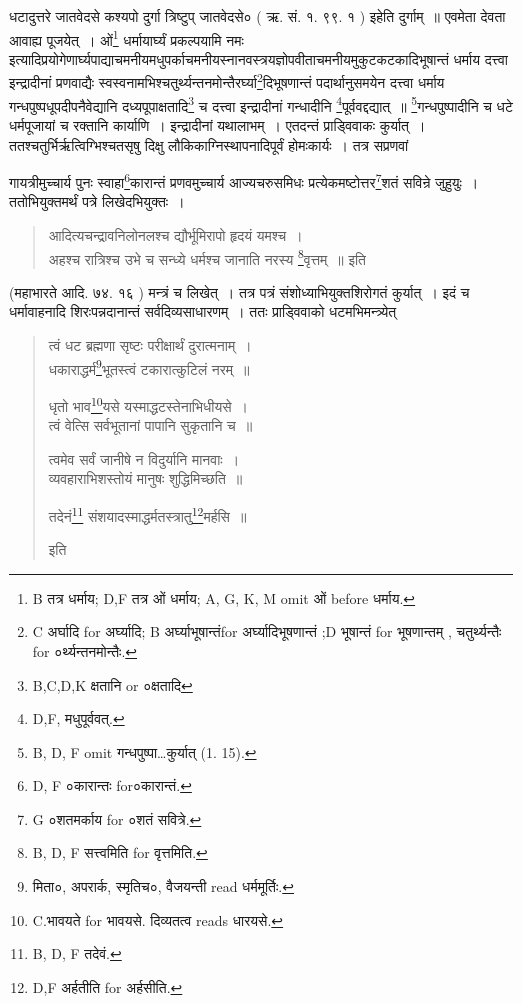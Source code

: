 \documentclass[11pt, openany]{book}
\begin{document}
\begin{sloppypar}
\noindent
धटादुत्तरे जातवेदसे कश्यपो दुर्गा त्रिष्टुप् जातवेदसे० ( ऋ. सं. १. ९९. १ ) इहेति दुर्गाम्~॥ एवमेता देवता आवाह्य पूजयेत्~। ओं\renewcommand{\thefootnote}{5}\footnote{B तत्र धर्माय; D,F तत्र ओं धर्माय; A, G, K, M omit ओं before धर्माय.} धर्मायार्घ्यं प्रकल्पयामि नमः इत्यादिप्रयोगेणार्घ्यपाद्याचमनीयमधुपर्काचमनीयस्नानवस्त्रयज्ञोपवीताचमनीयमुकुटकटकादिभूषान्तं धर्माय दत्त्वा इन्द्रादीनां प्रणवाद्यैः स्वस्वनामभिश्चतुर्थ्यन्तनमोन्तैरर्घ्या\renewcommand{\thefootnote}{6}\footnote{C अर्घादि for अर्घ्यादि; B अर्घ्याभूषान्तंfor अर्घ्यादिभूषणान्तं ;D भूषान्तं for भूषणान्तम् , चतुर्थ्यन्तैः for ०र्थ्यन्तनमोन्तैः.}दिभूषणान्तं पदार्थानुसमयेन दत्त्वा धर्माय गन्धपुष्पधूपदीपनैवेद्यानि दध्यपूपाक्षतादि\renewcommand{\thefootnote}{7}\footnote{B,C,D,K क्षतानि or ०क्षतादि} च दत्त्वा इन्द्रादीनां गन्धादीनि \renewcommand{\thefootnote}{8}\footnote{D,F, मधुपूर्ववत्.}पूर्ववद्दद्यात्~॥ \renewcommand{\thefootnote}{9}\footnote{B, D, F omit गन्धपुष्पा\ldots कुर्यात् (1. 15).}गन्धपुष्पादीनि च धटे धर्मपूजायां च रक्तानि कार्याणि~। इन्द्रादीनां यथालाभम्~। एतदन्तं प्राड्विवाकः कुर्यात्~। ततश्चतुर्भिर्ऋत्विग्भिश्चतसृषु दिक्षु लौकिकाग्निस्थापनादिपूर्वं होमःकार्यः~। तत्र सप्रणवां 
\end{sloppypar}

\newpage

\noindent
गायत्रीमुच्चार्य पुनः स्वाहा\renewcommand{\thefootnote}{1}\footnote{D, F ०कारान्तः for०कारान्तं.}कारान्तं प्रणवमुच्चार्य आज्यचरुसमिधः प्रत्येकमष्टोत्तर\renewcommand{\thefootnote}{2}\footnote{G ०शतमर्काय for ०शतं सवित्रे.}शतं सविन्रे जुहुयुः~। ततोभियुक्तमर्थं पत्रे लिखेदभियुक्तः~।

\begin{quote}
{\vy आदित्यचन्द्रावनिलोनलश्च द्यौर्भूमिरापो हृदयं यमश्च~।\\
अहश्च रात्रिश्च उभे च सन्ध्ये धर्मश्च जानाति नरस्य \renewcommand{\thefootnote}{3}\footnote{B, D, F सत्त्वमिति for वृत्तमिति.}वृत्तम्~॥} इति 
\end{quote}

\noindent
(महाभारते आदि. ७४. १६ ) मन्त्रं च लिखेत्~। तत्र पत्रं संशोध्याभियुक्तशिरोगतं कुर्यात्~। इदं च धर्मावाहनादि शिरःपन्नदानान्तं सर्वदिव्यसाधारणम्~। ततः प्राड्विवाको धटमभिमन्त्र्येत्

\begin{quote}
{\vy त्वं धट ब्रह्मणा सृष्टः परीक्षार्थं दुरात्मनाम्~।\\
धकाराद्धर्म\renewcommand{\thefootnote}{4}\footnote{मिता०, अपरार्क, स्मृतिच०, वैजयन्ती read धर्ममूर्तिः.}भूतस्त्वं टकारात्कुटिलं नरम्~॥

धृतो भाव\renewcommand{\thefootnote}{5}\footnote{C.भावयते for भावयसे. दिव्यतत्व reads धारयसे.}यसे यस्माद्धटस्तेनाभिधीयसे~।\\
त्वं वेत्सि सर्वभूतानां पापानि सुकृतानि च~॥

त्वमेव सर्वं जानीषे न विदुर्यानि मानवाः~।\\
व्यवहाराभिशस्तोयं मानुषः शुद्धिमिच्छति~॥

तदेनं\renewcommand{\thefootnote}{6}\footnote{B, D, F तदेवं.} संशयादस्माद्धर्मतस्त्रातु\renewcommand{\thefootnote}{7}\footnote{D,F अर्हतीति for अर्हसीति.}मर्हसि~॥} इति
\end{quote}
\end{document}
